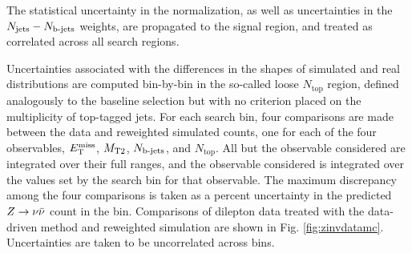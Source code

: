 The statistical uncertainty in the normalization, as well as uncertainties in the $N_{\rm jets}-N_{\text{b-jets}}$ weights, are propagated to the signal region, and treated as correlated across all search regions.

Uncertainties associated with the differences in the shapes of simulated and real distributions are computed bin-by-bin in the so-called loose $N_{\text{top}}$ region, defined analogously to the baseline selection but with no criterion placed on the multiplicity of top-tagged jets. For each search bin, four comparisons are made between the data and reweighted simulated counts, one for each of the four observables, $E_{\text{T}}^{\rm miss}$, $M_{\text{T}2}$, $N_{\text{b-jets}}$, and $N_{\text{top}}$. All but the observable considered are integrated over their full ranges, and the observable considered is integrated over the values set by the search bin for that observable. The maximum discrepancy among the four comparisons is taken as a percent uncertainty in the predicted $Z\rightarrow \nu\bar{\nu}$ count in the bin. Comparisons of dilepton data treated with the data-driven method and reweighted simulation are shown in Fig. \ref{fig:zinvdatamc}. Uncertainties are taken to be uncorrelated across bins.


